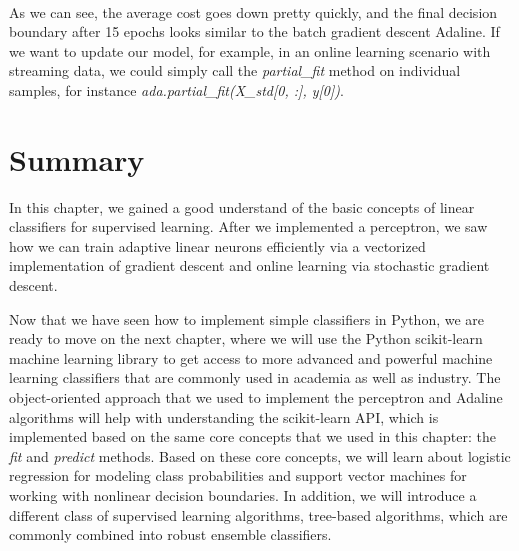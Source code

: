 \documentclass[11pt]{article}
\begin{document}
    \begin{center}
    \end{center}
    { \hspace*{\fill} \\}
    
    As we can see, the average cost goes down pretty quickly, and the final
decision boundary after 15 epochs looks similar to the batch gradient
descent Adaline. If we want to update our model, for example, in an
online learning scenario with streaming data, we could simply call the
\emph{partial\_fit} method on individual samples, for instance
\emph{ada.partial\_fit(X\_std{[}0, :{]}, y{[}0{]})}.

    \section{Summary}\label{summary}

    In this chapter, we gained a good understand of the basic concepts of
linear classifiers for supervised learning. After we implemented a
perceptron, we saw how we can train adaptive linear neurons efficiently
via a vectorized implementation of gradient descent and online learning
via stochastic gradient descent.

Now that we have seen how to implement simple classifiers in Python, we
are ready to move on the next chapter, where we will use the Python
scikit-learn machine learning library to get access to more advanced and
powerful machine learning classifiers that are commonly used in academia
as well as industry. The object-oriented approach that we used to
implement the perceptron and Adaline algorithms will help with
understanding the scikit-learn API, which is implemented based on the
same core concepts that we used in this chapter: the \emph{fit} and
\emph{predict} methods. Based on these core concepts, we will learn
about logistic regression for modeling class probabilities and support
vector machines for working with nonlinear decision boundaries. In
addition, we will introduce a different class of supervised learning
algorithms, tree-based algorithms, which are commonly combined into
robust ensemble classifiers.


    
    
    
    
\end{document}
